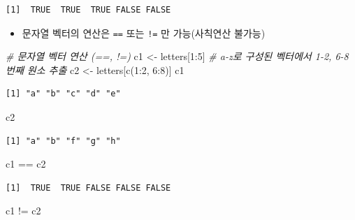 \documentclass[
  11pt,
]{krantz}
\newenvironment{Shaded}{\begin{snugshade}}{\end{snugshade}}
\newcommand{\CommentTok}[1]{\textcolor[rgb]{0.37,0.37,0.37}{\textit{#1}}}
\newcommand{\DecValTok}[1]{\textcolor[rgb]{0.06,0.06,0.06}{#1}}
\newcommand{\FunctionTok}[1]{\textcolor[rgb]{0,0,0}{#1}}
\newcommand{\NormalTok}[1]{#1}
\newcommand{\OtherTok}[1]{\textcolor[rgb]{0.37,0.37,0.37}{#1}}
\newcommand{\SpecialCharTok}[1]{\textcolor[rgb]{0,0,0}{#1}}
\providecommand{\tightlist}{%
  \setlength{\itemsep}{0pt}\setlength{\parskip}{0pt}}
\begin{document}
\begin{verbatim}
[1]  TRUE  TRUE  TRUE FALSE FALSE
\end{verbatim}

\normalsize

\begin{itemize}
\tightlist
\item
  문자열 벡터의 연산은 \texttt{==} 또는 \texttt{!=} 만 가능(사칙연산 불가능)
\end{itemize}

\footnotesize

\begin{Shaded}
\begin{Highlighting}[]
\CommentTok{\# 문자열 벡터 연산 (==, !=)}
\NormalTok{c1 }\OtherTok{\textless{}{-}}\NormalTok{ letters[}\DecValTok{1}\SpecialCharTok{:}\DecValTok{5}\NormalTok{]}
\CommentTok{\# a{-}z로 구성된 벡터에서 1{-}2, 6{-}8 번째 원소 추출}
\NormalTok{c2 }\OtherTok{\textless{}{-}}\NormalTok{ letters[}\FunctionTok{c}\NormalTok{(}\DecValTok{1}\SpecialCharTok{:}\DecValTok{2}\NormalTok{, }\DecValTok{6}\SpecialCharTok{:}\DecValTok{8}\NormalTok{)] }
\NormalTok{c1}
\end{Highlighting}
\end{Shaded}

\begin{verbatim}
[1] "a" "b" "c" "d" "e"
\end{verbatim}

\begin{Shaded}
\begin{Highlighting}[]
\NormalTok{c2}
\end{Highlighting}
\end{Shaded}

\begin{verbatim}
[1] "a" "b" "f" "g" "h"
\end{verbatim}

\begin{Shaded}
\begin{Highlighting}[]
\NormalTok{c1 }\SpecialCharTok{==}\NormalTok{ c2}
\end{Highlighting}
\end{Shaded}

\begin{verbatim}
[1]  TRUE  TRUE FALSE FALSE FALSE
\end{verbatim}

\begin{Shaded}
\begin{Highlighting}[]
\NormalTok{c1 }\SpecialCharTok{!=}\NormalTok{ c2}
\end{Highlighting}
\end{Shaded}
\end{document}
